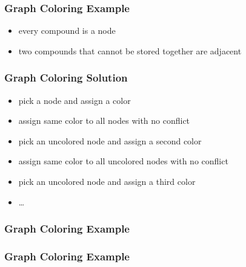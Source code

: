 \documentclass[dvipsnames]{beamer}
\begin{document}
\begin{frame}
  \frametitle{Graph Coloring Example}

  \begin{itemize}
    \item every compound is a node
    \item two compounds that cannot be stored together are adjacent
  \end{itemize}

  \begin{center}
  \end{center}
\end{frame}

\begin{frame}
  \frametitle{Graph Coloring Solution}

  \begin{itemize}
    \item pick a node and assign a color
    \item assign same color to all nodes with no conflict
    \item pick an uncolored node and assign a second color
    \item assign same color to all uncolored nodes with no conflict
    \item pick an uncolored node and assign a third color
    \item \ldots
  \end{itemize}
\end{frame}

\begin{frame}
  \frametitle{Graph Coloring Example}

  \begin{center}
  \end{center}
\end{frame}

\begin{frame}
  \frametitle{Graph Coloring Example}

  \begin{columns}
    \begin{center}
    \end{center}

    \begin{center}
    \end{center}
  \end{columns}
\end{frame}
\end{document}
